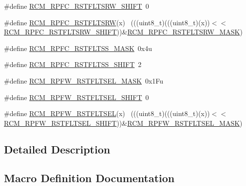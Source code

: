 \begin{DoxyCompactItemize}
\#define \hyperlink{group___r_c_m___register___masks_gad869b7629ba10023abe459d7293fd281}{R\+C\+M\+\_\+\+R\+P\+F\+C\+\_\+\+R\+S\+T\+F\+L\+T\+S\+R\+W\+\_\+\+S\+H\+I\+FT}~0
\item 
\#define \hyperlink{group___r_c_m___register___masks_ga3ca72ed675321a6b8939c43f1616ecc6}{R\+C\+M\+\_\+\+R\+P\+F\+C\+\_\+\+R\+S\+T\+F\+L\+T\+S\+RW}(x)                                    ~(((uint8\+\_\+t)(((uint8\+\_\+t)(x))$<$$<$\hyperlink{group___r_c_m___register___masks_gad869b7629ba10023abe459d7293fd281}{R\+C\+M\+\_\+\+R\+P\+F\+C\+\_\+\+R\+S\+T\+F\+L\+T\+S\+R\+W\+\_\+\+S\+H\+I\+FT}))\&\hyperlink{group___r_c_m___register___masks_ga36e0fc448dc94b90314dd6dd2dd41763}{R\+C\+M\+\_\+\+R\+P\+F\+C\+\_\+\+R\+S\+T\+F\+L\+T\+S\+R\+W\+\_\+\+M\+A\+SK})
\item 
\#define \hyperlink{group___r_c_m___register___masks_gadfb0f8132fbbc978c9756a2adfbf2ed0}{R\+C\+M\+\_\+\+R\+P\+F\+C\+\_\+\+R\+S\+T\+F\+L\+T\+S\+S\+\_\+\+M\+A\+SK}~0x4u
\item 
\#define \hyperlink{group___r_c_m___register___masks_ga4c39eb26fa537bf5e4e6b0ea82ffaeb2}{R\+C\+M\+\_\+\+R\+P\+F\+C\+\_\+\+R\+S\+T\+F\+L\+T\+S\+S\+\_\+\+S\+H\+I\+FT}~2
\item 
\#define \hyperlink{group___r_c_m___register___masks_ga60f29f78d245476ae9716d81b5728739}{R\+C\+M\+\_\+\+R\+P\+F\+W\+\_\+\+R\+S\+T\+F\+L\+T\+S\+E\+L\+\_\+\+M\+A\+SK}~0x1\+Fu
\item 
\#define \hyperlink{group___r_c_m___register___masks_ga489d9757284af48af000b769d36bf21a}{R\+C\+M\+\_\+\+R\+P\+F\+W\+\_\+\+R\+S\+T\+F\+L\+T\+S\+E\+L\+\_\+\+S\+H\+I\+FT}~0
\item 
\#define \hyperlink{group___r_c_m___register___masks_gaed8a9ebad93d9ea2a3b3a827890f983d}{R\+C\+M\+\_\+\+R\+P\+F\+W\+\_\+\+R\+S\+T\+F\+L\+T\+S\+EL}(x)                                    ~(((uint8\+\_\+t)(((uint8\+\_\+t)(x))$<$$<$\hyperlink{group___r_c_m___register___masks_ga489d9757284af48af000b769d36bf21a}{R\+C\+M\+\_\+\+R\+P\+F\+W\+\_\+\+R\+S\+T\+F\+L\+T\+S\+E\+L\+\_\+\+S\+H\+I\+FT}))\&\hyperlink{group___r_c_m___register___masks_ga60f29f78d245476ae9716d81b5728739}{R\+C\+M\+\_\+\+R\+P\+F\+W\+\_\+\+R\+S\+T\+F\+L\+T\+S\+E\+L\+\_\+\+M\+A\+SK})
\end{DoxyCompactItemize}


\subsection{Detailed Description}


\subsection{Macro Definition Documentation}
